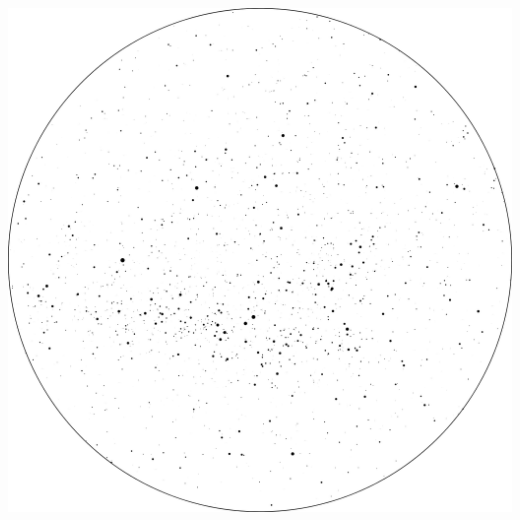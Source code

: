\documentclass{./SAS-class-skygen}
\begin{document}
	\vspace{0.5cm}
    \begin{center}
    \includegraphics[width=\textwidth]{./pics/skychart6.png}
    \end{center}
    
    
\end{document}
